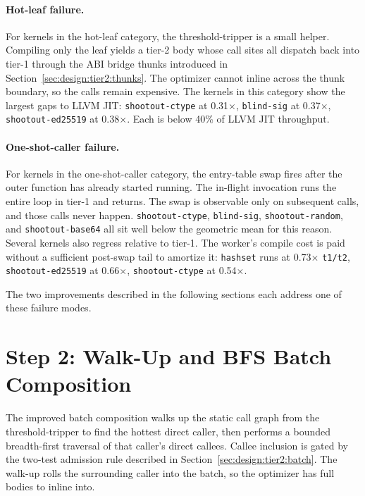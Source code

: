 \paragraph{Hot-leaf failure.} For kernels in the hot-leaf category, the threshold-tripper is a small helper. Compiling only the leaf yields a tier-2 body whose call sites all dispatch back into tier-1 through the ABI bridge thunks introduced in Section~\ref{sec:design:tier2:thunks}. The optimizer cannot inline across the thunk boundary, so the calls remain expensive. The kernels in this category show the largest gaps to LLVM JIT: \texttt{shootout-ctype} at 0.31$\times$, \texttt{blind-sig} at 0.37$\times$, \texttt{shootout-ed25519} at 0.38$\times$. Each is below 40\% of LLVM JIT throughput.

\paragraph{One-shot-caller failure.} For kernels in the one-shot-caller category, the entry-table swap fires after the outer function has already started running. The in-flight invocation runs the entire loop in tier-1 and returns. The swap is observable only on subsequent calls, and those calls never happen. \texttt{shootout-ctype}, \texttt{blind-sig}, \texttt{shootout-random}, and \texttt{shootout-base64} all sit well below the geometric mean for this reason. Several kernels also regress relative to tier-1. The worker's compile cost is paid without a sufficient post-swap tail to amortize it: \texttt{hashset} runs at 0.73$\times$ \texttt{t1/t2}, \texttt{shootout-ed25519} at 0.66$\times$, \texttt{shootout-ctype} at 0.54$\times$.

The two improvements described in the following sections each address one of these failure modes.

\section{Step 2: Walk-Up and BFS Batch Composition}
\label{sec:eval:step2}

The improved batch composition walks up the static call graph from the threshold-tripper to find the hottest direct caller, then performs a bounded breadth-first traversal of that caller's direct callees. Callee inclusion is gated by the two-test admission rule described in Section~\ref{sec:design:tier2:batch}. The walk-up rolls the surrounding caller into the batch, so the optimizer has full bodies to inline into.


